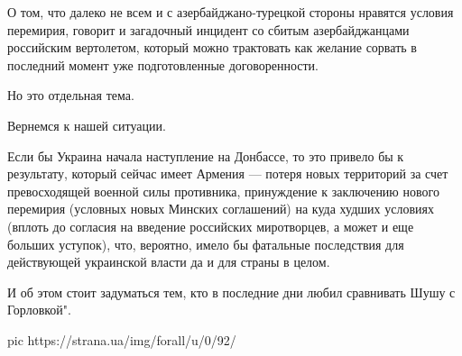 О том, что далеко не всем и с азербайджано-турецкой стороны нравятся условия
перемирия, говорит и загадочный инцидент со сбитым азербайджанцами российским
вертолетом, который можно трактовать как желание сорвать в последний момент уже
подготовленные договоренности.

Но это отдельная тема.

Вернемся к нашей ситуации.

Если бы Украина начала наступление на Донбассе, то это привело бы к
результату, который сейчас имеет Армения --- потеря новых территорий за счет
превосходящей военной силы противника, принуждение к заключению нового
перемирия (условных новых Минских соглашений) на куда худших условиях
(вплоть до согласия на введение российских миротворцев, а может и еще
больших уступок), что, вероятно, имело бы фатальные последствия для
действующей украинской власти да и для страны в целом.

И об этом стоит задуматься тем, кто в последние дни любил сравнивать Шушу с
Горловкой".

\ifcmt
pic https://strana.ua/img/forall/u/0/92/%
\fi
